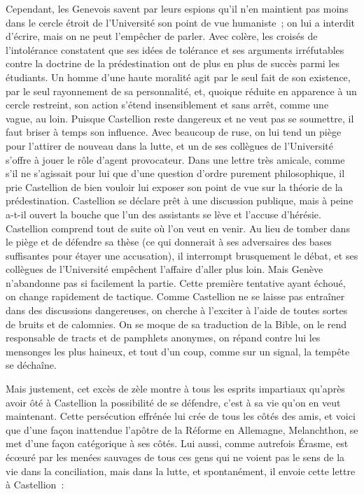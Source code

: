 \documentclass[french,twoside]{book} %
\begin{document}
Cependant, les Genevois savent par leurs espions qu’il n’en maintient pas moins dans le cercle étroit de l’Université son point de vue humaniste ; on lui a interdit d’écrire, mais on ne peut l’empêcher de parler. Avec colère, les croisés de l’intolérance constatent que ses idées de tolérance et ses arguments irréfutables contre la doctrine de la prédestination ont de plus en plus de succès parmi les étudiants. Un homme d’une haute moralité agit par le seul fait de son existence, par le seul rayonnement de sa personnalité, et, quoique réduite en apparence à un cercle restreint, son action s’étend insensiblement et sans arrêt, comme une vague, au loin. Puisque Castellion reste dangereux et ne veut pas se soumettre, il faut briser à temps son influence. Avec beaucoup de ruse, on lui tend un piège pour l’attirer de nouveau dans la lutte, et un de ses collègues de l’Université s’offre à jouer le rôle d’agent provocateur. Dans une lettre très amicale, comme s’il ne s’agissait pour lui que d’une question d’ordre purement philosophique, il prie Castellion de bien vouloir lui exposer son point de vue sur la théorie de la prédestination. Castellion se déclare prêt à une discussion publique, mais à peine a-t-il ouvert la bouche que l’un des assistants se lève et l’accuse d’hérésie. Castellion comprend tout de suite où l’on veut en venir. Au lieu de tomber dans le piège et de défendre sa thèse (ce qui donnerait à ses adversaires des bases suffisantes pour étayer une accusation), il interrompt brusquement le débat, et ses collègues de l’Université empêchent l’affaire d’aller plus loin. Mais Genève n’abandonne pas si facilement la partie. Cette première tentative ayant échoué, on change rapidement de tactique. Comme Castellion ne se laisse pas entraîner dans des discussions dangereuses, on cherche à l’exciter à l’aide de toutes sortes de bruits et de calomnies. On se moque de sa traduction de la Bible, on le rend responsable de tracts et de pamphlets anonymes, on répand contre lui les mensonges les plus haineux, et tout d’un coup, comme sur un signal, la tempête se déchaîne.\par
Mais justement, cet excès de zèle montre à tous les esprits impartiaux qu’après avoir ôté à Castellion la possibilité de se défendre, c’est à sa vie qu’on en veut maintenant. Cette persécution effrénée lui crée de tous les côtés des amis, et voici que d’une façon inattendue l’apôtre de la Réforme en Allemagne, Melanchthon, se met d’une façon catégorique à ses côtés. Lui aussi, comme autrefois Érasme, est écœuré par les menées sauvages de tous ces gens qui ne voient pas le sens de la vie dans la conciliation, mais dans la lutte, et spontanément, il envoie cette lettre à Castellion :\par
\end{document}

